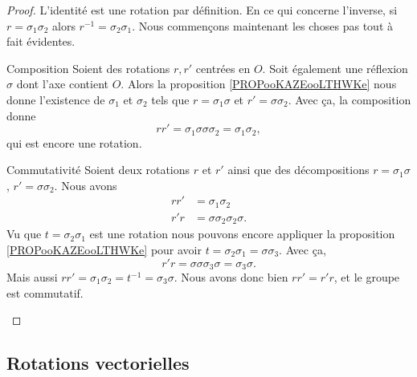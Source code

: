 \begin{proof}
    L'identité est une rotation par définition. En ce qui concerne l'inverse, si \( r=\sigma_1\sigma_2\) alors \( r^{-1}=\sigma_2\sigma_1\). Nous commençons maintenant les choses pas tout à fait évidentes.
    \begin{subproof}
        \item[Composition]
            Soient des rotations \( r,r'\) centrées en \( O\). Soit également une réflexion \( \sigma\) dont l'axe contient \( O\). Alors la proposition \ref{PROPooKAZEooLTHWKe} nous donne l'existence de \( \sigma_1\) et \( \sigma_2\) tels que \( r=\sigma_1\sigma\) et \( r'=\sigma\sigma_2\). Avec ça, la composition donne
            \begin{equation}
                rr'=\sigma_1\sigma\sigma\sigma_2=\sigma_1\sigma_2,
            \end{equation}
            qui est encore une rotation.
        \item[Commutativité]
            Soient deux rotations \( r\) et \( r'\) ainsi que des décompositions \( r=\sigma_1\sigma\), \( r'=\sigma\sigma_2\). Nous avons
            \begin{subequations}
                \begin{align}
                    rr'&=\sigma_1\sigma_2\\
                    r'r&=\sigma\sigma_2\sigma_2\sigma.
                \end{align}
            \end{subequations}
            Vu que \( t=\sigma_2\sigma_1\) est une rotation nous pouvons encore appliquer la proposition \ref{PROPooKAZEooLTHWKe} pour avoir \( t=\sigma_2\sigma_1=\sigma\sigma_3\). Avec ça,
            \begin{equation}
                r'r=\sigma\sigma\sigma_3\sigma=\sigma_3\sigma.
            \end{equation}
            Mais aussi \( rr'=\sigma_1\sigma_2=t^{-1}=\sigma_3\sigma\). Nous avons donc bien \( rr'=r'r\), et le groupe est commutatif.
    \end{subproof}
\end{proof}

\subsection{Rotations vectorielles}

